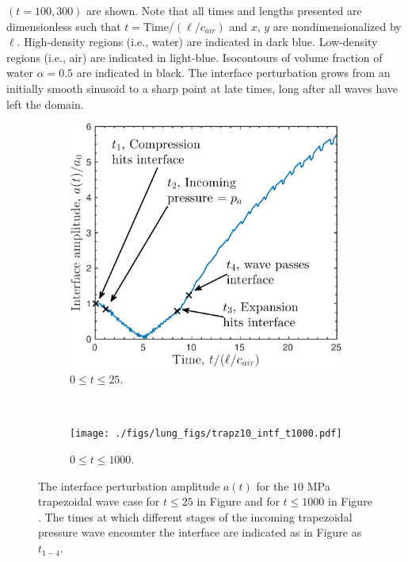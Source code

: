 \documentclass{jfm}%
\begin{document}
$(t=100, 300)$ are shown. Note that all times and lengths presented are
dimensionless such that $t = \text{Time}/\left(\ell/c_{air}\right)$ and $x$,
$y$ are nondimensionalized by $\ell$. High-density regions (i.e.,
water) are indicated in dark blue. Low-density regions (i.e., air) are
indicated in light-blue. Isocontours of volume fraction of water
$\alpha=0.5$ are indicated in black. The interface
perturbation grows from an initially smooth sinusoid to a sharp point
at late times, long after all waves have left the domain.
% 
\begin{figure}[h] 
  \centering
  \begin{subfigure}[b]{0.45\textwidth}
    \centering
    \includegraphics[width=\textwidth]{./figs/lung_figs/trapz10_intf_schematic.pdf}
    \caption{\label{fig:trapz10_interface25} $0\leq t \leq 25$.}
  \end{subfigure}
  ~
  \begin{subfigure}[b]{0.45\textwidth}
    \centering
    \texttt{[image: ./figs/lung\_figs/trapz10\_intf\_t1000.pdf]}%
    \caption{\label{fig:trapz10_interface1000} $0\leq t \leq 1000$.}
  \end{subfigure}
  \caption[The interface perturbation amplitude history for 10 MPa
  trapezoidal wave]{The interface perturbation amplitude $a(t)$ for
    the $10$ MPa trapezoidal wave case for $t\leq25$ in Figure \protect{} and for
    $t\leq1000$ in Figure \protect{}. The times at which different stages of the
    incoming trapezoidal pressure wave encounter the interface are
    indicated as in Figure \protect{} as $t_{1-4}$.}
  \label{fig:trapz10_interface}
\end{figure}\par
\end{document}
